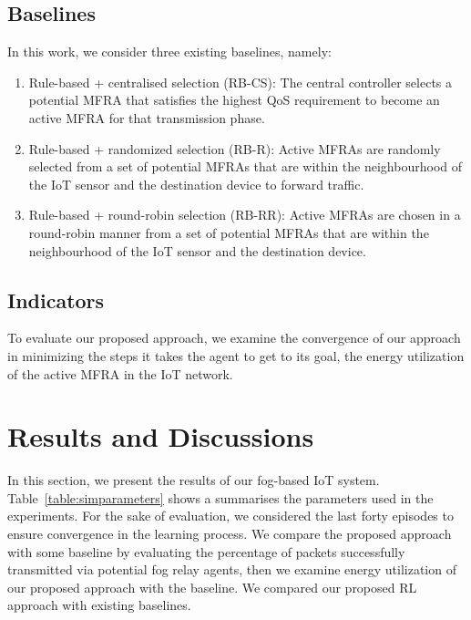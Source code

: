 \documentclass[journal]{IEEEtran}
\begin{document}
\subsection{Baselines}
In this work, we consider three existing baselines, namely:
\begin{enumerate}
  \item Rule-based + centralised selection (RB-CS): The central controller selects a potential MFRA that satisfies the highest QoS requirement to become an active MFRA for that transmission phase.
  \item Rule-based + randomized selection (RB-R): Active MFRAs are randomly selected from a set of potential MFRAs that are within the neighbourhood of the IoT sensor and the destination device to forward traffic.
  \item Rule-based + round-robin selection (RB-RR): Active MFRAs are chosen in a round-robin manner from a set of potential MFRAs that are within the neighbourhood of the IoT sensor and the destination device.
\end{enumerate}


\subsection{Indicators}
To evaluate our proposed approach, we examine the convergence of our approach in minimizing the steps it takes the agent to get to its goal, the energy utilization of the active MFRA in the IoT network.



\section{Results and Discussions}
In this section, we present the results of our fog-based IoT system. Table~\ref{table:simparameters} shows a summarises the parameters used in the experiments. For the sake of evaluation, we considered the last forty episodes to ensure convergence in the learning process. We compare the proposed approach with some baseline by evaluating the percentage of packets successfully transmitted via potential fog relay agents, then we examine energy utilization of our proposed approach with the baseline. We compared our proposed RL approach with existing baselines.
\end{document}
